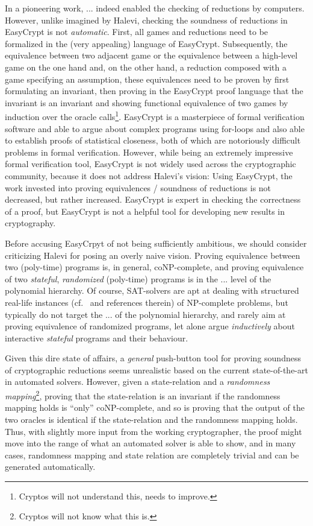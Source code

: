{In a pioneering work, ... indeed enabled the checking of reductions by computers. However, unlike imagined by Halevi, checking the soundness of reductions in EasyCrypt is not \emph{automatic}. First, all games and reductions need to be formalized in the (very appealing) language of EasyCrypt. Subsequently, the equivalence between two adjacent game or the equivalence between a high-level game on the one hand and, on the other hand, a reduction composed with a game specifying an assumption, these equivalences need to be proven by first formulating an invariant, then proving in the EasyCrypt proof language that the invariant is an invariant and showing functional equivalence of two games by induction over the oracle calls\footnote{Cryptos will not understand this, needs to improve.}. EasyCrypt is a masterpiece of formal verification software and able to argue about complex programs using for-loops and also able to establish proofs of statistical closeness, both of which are notoriously difficult problems in formal verification. However, while being an extremely impressive formal verification tool, EasyCrypt is not widely used across the cryptographic community, because it does not address Halevi's vision: Using EasyCrypt, the work invested into proving equivalences / soundness of reductions is not decreased, but rather increased. EasyCrypt is expert in checking the correctness of a proof, but EasyCrypt is not a helpful tool for developing new results in cryptography.

Before accusing EasyCrpyt of not being sufficiently ambitious, we should consider criticizing Halevi for posing an overly naive vision. Proving equivalence between two (poly-time) programs is, in general, coNP-complete, and proving equivalence of two \emph{stateful}, \emph{randomized} (poly-time) programs is in the ... level of the polynomial hierarchy. Of course, SAT-solvers are apt at dealing with structured real-life instances (cf.~\cite{X,Y,Z} and references therein) of NP-complete problems, but typically do not target the ... of the polynomial hierarchy, and rarely aim at proving equivalence of randomized programs, let alone argue \emph{inductively} about interactive \emph{stateful} programs and their behaviour.

Given this dire state of affairs, a \emph{general} push-button tool for proving soundness of cryptographic reductions seems unrealistic based on the current state-of-the-art in automated solvers. However, given a state-relation and a \emph{randomness mapping}\footnote{Cryptos will not know what this is.}, proving that the state-relation is an invariant if the randomness mapping holds is ``only'' coNP-complete, and so is proving that the output of the two oracles is identical if the state-relation and the randomness mapping holds. Thus, with slightly more input from the working cryptographer, the proof might move into the range of what an automated solver is able to show, and in many cases, randomness mapping and state relation are completely trivial and can be generated automatically.

}
